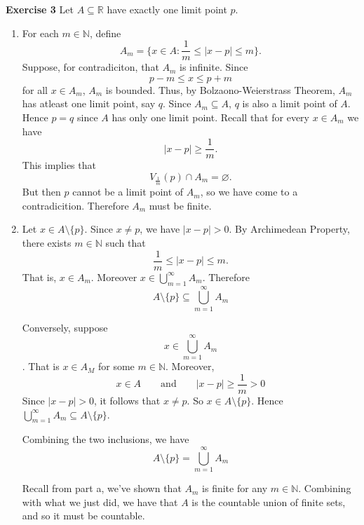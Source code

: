 \documentclass[12pt]{article}
\begin{document}
\textbf{Exercise 3}
Let \( A \subseteq \mathbb{R} \) have exactly one limit point \( p \).
\begin{enumerate}[label=(\alph*)]
    \item For each \( m \in \mathbb{N} \), define
          \[
              A_m = \{x \in A: \frac{1}{m} \leq \vert x-p \vert \leq m \}.
          \]
          Suppose, for contradiciton, that \( A_m \) is infinite.
          Since
          \[
              p - m \leq  x \leq p + m
          \]
          for all \( x \in A_m \), \( A_m \) is bounded.
          Thus, by Bolzaono-Weierstrass Theorem, \( A_m \) has atleast one limit point, say \( q \). Since \( A_m \subseteq A \), \( q \) is also a limit point of \( A \). Hence \( p = q \) since \( A \) has only one limit point. Recall that for every \( x \in A_m \) we have
          \[
              \vert x - p \vert  \geq \frac{1}{m}.
          \]
          This implies that
          \[
              V_{\frac{1}{m}}(p) \cap A_m = \varnothing.
          \]
          But then \( p \) cannot be a limit point of \( A_m \), so we have come to a contradicition. Therefore \( A_m \) must be finite.


    \item Let \( x \in A \setminus \{p\} \). Since \( x \neq p \), we have \( \vert x -p \vert  > 0 \). By Archimedean Property, there exists \( m \in \mathbb{N} \) such that
          \[
              \frac{1}{m} \leq \vert x - p \vert \leq m.
          \]
          That is, \( x \in A_m \). Moreover \( x \in \bigcup_{m=1}^{\infty} A_m \). Therefore
          \[
              A \setminus \{p\} \subseteq \bigcup_{m=1}^{\infty} A_m
          \]

          Conversely, suppose \[ x \in \bigcup_{m=1}^{\infty} A_m \]. That is \( x \in A_M \) for some \( m \in \mathbb{N} \). Moreover,
          \[
              x \in A \qquad \text{and} \qquad \vert x-p \vert \geq \frac{1}{m} > 0
          \]
          Since \( \vert x - p \vert > 0 \), it follows that \( x \neq p \). So \( x \in A \setminus \{p\} \). Hence \( \bigcup_{m=1}^{\infty} A_m \subseteq A \setminus \{p\} \).

          Combining the two inclusions, we have
          \[
              A \setminus \{p\} = \bigcup_{m=1}^{\infty} A_m
          \]

          Recall from part a, we've shown that \( A_m \) is finite for any \( m \in \mathbb{N} \). Combining with what we just did, we have that \( A \) is the countable union of finite sets, and so it must be countable.
\end{enumerate}
\end{document}
